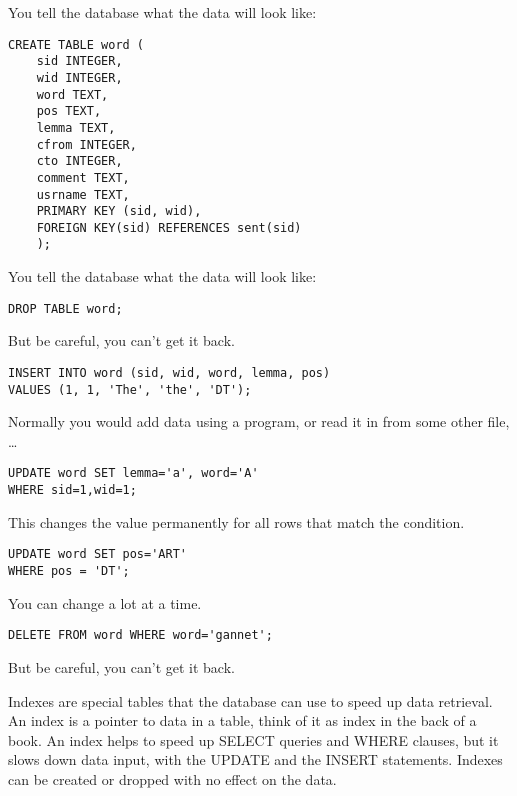 \documentclass[a4paper,landscape,headrule,footrule,xetex]{foils}
\begin{document}

You tell the database what the data will look like:
\begin{verbatim}
CREATE TABLE word (
    sid INTEGER,
    wid INTEGER,
    word TEXT,
    pos TEXT,
    lemma TEXT,
    cfrom INTEGER,
    cto INTEGER,
    comment TEXT,
    usrname TEXT,			
    PRIMARY KEY (sid, wid),
    FOREIGN KEY(sid) REFERENCES sent(sid)
    );
\end{verbatim}

You tell the database what the data will look like:
\begin{verbatim}
DROP TABLE word;
\end{verbatim}

But be careful, you can't get it back.


\begin{verbatim}
INSERT INTO word (sid, wid, word, lemma, pos)  
VALUES (1, 1, 'The', 'the', 'DT');
\end{verbatim}

Normally you would add data using a program, or read it in from some
other file, \ldots


\begin{verbatim}
UPDATE word SET lemma='a', word='A'
WHERE sid=1,wid=1;
\end{verbatim}

This changes the value permanently for all rows that match the
condition.

\begin{verbatim}
UPDATE word SET pos='ART'
WHERE pos = 'DT';
\end{verbatim}

You can change a lot at a time.


\begin{verbatim}
DELETE FROM word WHERE word='gannet';
\end{verbatim}

But be careful, you can't get it back.


Indexes are special tables that the database can use to speed up data
retrieval.  An index is a pointer to data in a table, think of it as
index in the back of a book.  An index helps to speed up SELECT
queries and WHERE clauses, but it slows down data input, with the
UPDATE and the INSERT statements. Indexes can be created or dropped
with no effect on the data.
\end{document}
